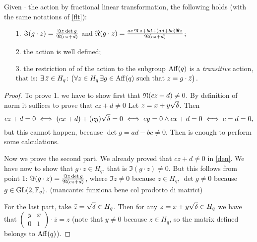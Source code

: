 \begin{prop}
Given $\cdot$ the action by fractional linear transformation, the following holds (with the same notations of \ref{flt}):
\begin{itemize}
\item[1.] $\Im (g\cdot z) = \frac{\Im z \det g}{\operatorname{\mathfrak{N}} (cz+d)}$ and
$\Re (g\cdot z) = \frac{ac\operatorname{\mathfrak{N}} z +bd+(ad+bc)\Re z}{\operatorname{\mathfrak{N}} (cz+d)}$;
\item[2.] the action is well defined;
\item[3.] the restriction of of the action to the subgroup $\operatorname{Aff} (q)$ is a {\it transitive} action, that is:
	$\exists \, \bar{z} \in H_q \colon \big( \forall z \in H_q\, \exists g \in \operatorname{Aff} (q)\,\,\text{such that}\,\, z=g \cdot \bar{z} \big) $. 
\end{itemize}
\begin{proof}
To prove 1. we have to show first that $\operatorname{\mathfrak{N}} (cz+d)\neq 0$. 
By definition of norm it suffices to prove that $cz+d\neq 0$  Let $z=x+y\sqrt{\delta}$. Then
\begin{equation}\label{den}
	cz+d=0 \iff (cx+d)+(cy)\sqrt{\delta}=0 \iff cy=0 \land cx+d=0 \iff c=d=0,
\end{equation}
but this cannot happen, because $\det g = ad-bc \neq 0$. Then is enough to perform some calculations.

Now we prove the second part. We already proved that $cz+d\neq 0$ in \ref{den}.
We have now to show that $g\cdot z \in H_q$, that is $\Im (g\cdot z)\neq 0$. But this follows from point 1:
$\Im (g\cdot z) = \frac{\Im z \det g}{\operatorname{\mathfrak{N}} (cz+d)}$, where $\Im z \neq 0$ because $z \in H_q$,
$\det g \neq 0$ because $g \in \operatorname{GL}(2,{\mathbb F}_q)$. (mancante: funziona bene col prodotto di matrici)

For the last part, take $\bar{z} = \sqrt{\delta} \in H_q$. Then for any $z=x+y\sqrt{\delta} \in H_q$ we have that $\begin{pmatrix} y & x \\ 0 & 1 \end{pmatrix} \cdot \bar{z} = z$ (note that $y\neq 0$ because $z \in H_q$, so the matrix defined belongs to $\operatorname{Aff} (q)$).
\end{proof}
\end{prop}

